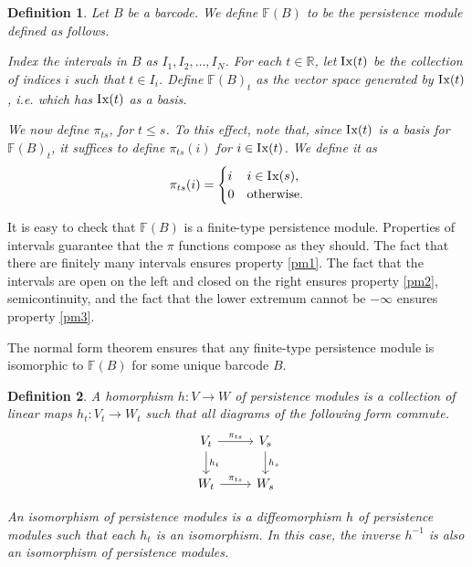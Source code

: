 \documentclass{article}
\newtheorem{definition}{Definition}
\theoremstyle{nonumberplain}
\newcommand{\R}{\mathbb{R}}
\newcommand{\FF}{\mathbb{F}} %
\newcommand{\Ix}{\mathop{\mathrm{I\mkern0.7mu x}}}
\begin{document}
\begin{definition}\label{def:pmfrombarcode}
Let $B$ be a barcode. We define $\FF(B)$ to be the persistence module defined as follows.

Index the intervals in $B$ as $I_1, I_2, \dots, I_N$. For each $t \in \R$, let $\Ix(t)$ be the collection of indices $i$ such that $t \in I_i$. Define $\FF(B)_t$ as the vector space generated by $\Ix(t)$, i.e. which has $\Ix(t)$ as a basis.

We now define $\pi_{ts}$, for $t \leq s$. To this effect, note that, since $\Ix(t)$ is a basis for $\FF(B)_t$, it suffices to define $\pi_{ts}(i)$ for $i \in \Ix(t)$. We define it as
\begin{equation}
\pi_{ts}(i) = \begin{cases} i & i \in \Ix(s),\\ 0 & \text{otherwise}. \end{cases}
\end{equation}
\end{definition}

It is easy to check that $\FF(B)$ is a finite-type persistence module. Properties of intervals guarantee that the $\pi$ functions compose as they should. The fact that there are finitely many intervals ensures property \ref{pm1}. The fact that the intervals are open on the left and closed on the right ensures property \ref{pm2}, semicontinuity, and the fact that the lower extremum cannot be $-\infty$ ensures property \ref{pm3}.

The normal form theorem ensures that any finite-type persistence module is isomorphic to $\FF(B)$ for some unique barcode $B$.

\begin{definition}
A homorphism $h \colon V \to W$ of persistence modules is a collection of linear maps $h_t \colon V_t \to W_t$ such that all diagrams of the following form commute.
\begin{equation}
\begin{tikzcd}
V_t \arrow[d, "h_t"] \arrow[r, "\pi_{ts}"] & V_s \arrow[d, "h_s"] \\
W_t \arrow[r, "\pi_{ts}"]                  & W_s                 
\end{tikzcd}
\end{equation}

An isomorphism of persistence modules is a diffeomorphism $h$ of persistence modules such that each $h_t$ is an isomorphism. In this case, the inverse $h^{-1}$ is also an isomorphism of persistence modules.
\end{definition}
\end{document}
